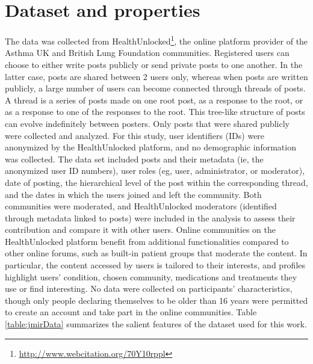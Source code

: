 \section{Dataset and properties}
The data was collected from HealthUnlocked\footnote{\url{http://www.webcitation.org/70Y10rppl}}, the online platform provider of the Asthma UK and British Lung Foundation communities. Registered users can choose to either write posts publicly or send private posts to one another. In the latter case, posts are shared between 2 users only, whereas when posts are written publicly, a large number of users can become connected through threads of posts. A thread is a series of posts made on one root post, as a response to the root, or as a response to one of the responses to the root. This tree-like structure of posts can evolve indefinitely between posters. 
Only posts that were shared publicly were collected and analyzed. For this study, user identifiers (IDs) were anonymized by the HealthUnlocked platform, and no demographic information was collected. 
The data set included posts and their metadata (ie, the anonymized user ID numbers), user roles (eg, user, administrator, or moderator), date of posting, the hierarchical level of the post within the corresponding thread, and the dates in which the users joined and left the community. Both communities were moderated, and HealthUnlocked moderators (identified through metadata linked to posts) were included in the analysis to assess their contribution and compare it with other users. Online communities on the HealthUnlocked platform benefit from additional functionalities compared to other online forums, such as built-in patient groups that moderate the content. In particular, the content accessed by users is tailored to their interests, and profiles highlight users’ condition, chosen community, medications and treatments they use or find interesting. No data were collected on participants’ characteristics, though only people declaring themselves to be older than 16 years were permitted to create an account and take part in the online communities. Table \ref{table:jmirData} summarizes the salient features of the dataset used for this work. 


